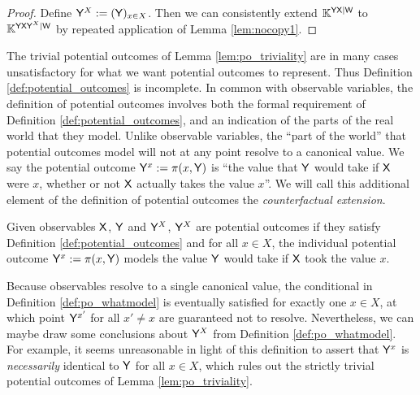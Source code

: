 \begin{proof}
Define $\mathsf{Y}^X:=(\mathsf{Y})_{x\in X}$. Then we can consistently extend $\mathbb{K}^{\mathsf{YX}|\mathsf{W}}$ to $\mathbb{K}^{\mathsf{YXY}^X|\mathsf{W}}$ by repeated application of Lemma \ref{lem:nocopy1}.
\end{proof}

The trivial potential outcomes of Lemma \ref{lem:po_triviality} are in many cases unsatisfactory for what we want potential outcomes to represent. Thus Definition \ref{def:potential_outcomes} is incomplete. In common with observable variables, the definition of potential outcomes involves both the formal requirement of Definition \ref{def:potential_outcomes}, and an indication of the parts of the real world that they model. Unlike observable variables, the ``part of the world'' that potential outcomes model will not at any point resolve to a canonical value. We say the potential outcome $\mathsf{Y}^x:=\pi(x,\mathsf{Y})$ is ``the value that $\mathsf{Y}$ would take if $\mathsf{X}$ were $x$, whether or not $\mathsf{X}$ actually takes the value $x$''. We will call this additional element of the definition of potential outcomes the \emph{counterfactual extension}.

\begin{definition}\label{def:po_whatmodel}
Given observables $\mathsf{X}$, $\mathsf{Y}$ and $\mathsf{Y}^X$, $\mathsf{Y}^X$ are potential outcomes if they satisfy Definition \ref{def:potential_outcomes} and for all $x\in X$, the individual potential outcome $\mathsf{Y}^x:=\pi(x,\mathsf{Y})$ models the value $\mathsf{Y}$ would take if $\mathsf{X}$ took the value $x$.
\end{definition}

Because observables resolve to a single canonical value, the conditional in Definition \ref{def:po_whatmodel} is eventually satisfied for exactly one $x\in X$, at which point $\mathsf{Y}^{x'}$ for all $x'\neq x$ are guaranteed not to resolve. Nevertheless, we can maybe draw some conclusions about $\mathsf{Y}^X$ from Definition \ref{def:po_whatmodel}. For example, it seems unreasonable in light of this definition to assert that $\mathsf{Y}^x$ is \emph{necessarily} identical to $\mathsf{Y}$ for all $x\in X$, which rules out the strictly trivial potential outcomes of Lemma \ref{lem:po_triviality}.

